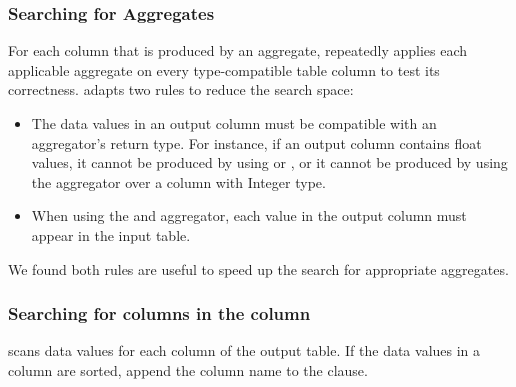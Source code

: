 





\subsubsection{Searching for Aggregates}
\label{sec:agg_search}

For each column that is produced by an aggregate,
\ourtool repeatedly applies each applicable aggregate on
every type-compatible table column to test its correctness.
\ourtool adapts two rules to reduce the search space:

\begin{itemize}
\item The data values in an output column must be compatible with an
aggregator's return type. For instance, if an output column
contains float values, it cannot be produced by using 
or , or it cannot be produced by
using the  aggregator over a column with Integer type.

\item When using the  and  aggregator,
each value in the output column must appear in the input
table.
\end{itemize}

We found both rules are useful to speed up the search for appropriate
aggregates.

\subsubsection{Searching for columns in the  column}
\label{sec:orderby}
\ourtool scans data values for each column of the output table. If
the data values in a column are sorted, \ourtool
append the column name to the  clause.

